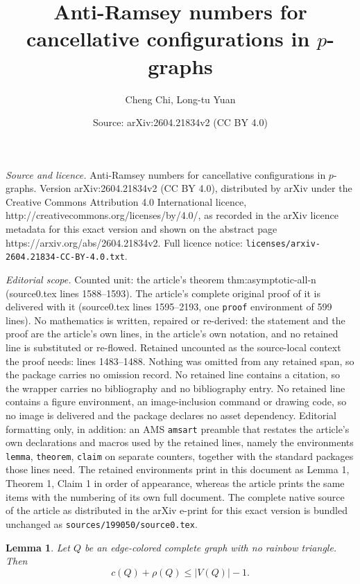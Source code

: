 \documentclass[10pt,a4paper]{amsart}
\title{Anti-Ramsey numbers for cancellative configurations in $p$-graphs}
\author{Cheng Chi, Long-tu Yuan}
\date{Source: arXiv:2604.21834v2 (CC BY 4.0)}
\newtheorem{lemma}{Lemma}
\begin{document}
\maketitle

\noindent\emph{Source and licence.} Anti-Ramsey numbers for cancellative configurations in $p$-graphs. Version arXiv:2604.21834v2 (CC BY 4.0), distributed by arXiv under the Creative Commons Attribution 4.0 International licence, http://creativecommons.org/licenses/by/4.0/, as recorded in the arXiv licence metadata for this exact version and shown on the abstract page https://arxiv.org/abs/2604.21834v2. Full licence notice: \texttt{licenses/arxiv-2604.21834-CC-BY-4.0.txt}.\par\smallskip

\noindent\textit{Editorial scope.} Counted unit: the article's theorem thm:asymptotic-all-n (source0.tex lines 1588--1593). The article's complete original proof of it is delivered with it (source0.tex lines 1595--2193, one \texttt{proof} environment of 599 lines). No mathematics is written, repaired or re-derived: the statement and the proof are the article's own lines, in the article's own notation, and no retained line is substituted or re-flowed.  Retained uncounted as the source-local context the proof needs: lines 1483--1488.  Nothing was omitted from any retained span, so the package carries no omission record.  No retained line contains a citation, so the wrapper carries no bibliography and no bibliography entry.  No retained line contains a figure environment, an image-inclusion command or drawing code, so no image is delivered and the package declares no asset dependency.  Editorial formatting only, in addition: an AMS \texttt{amsart} preamble that restates the article's own declarations and macros used by the retained lines, namely the environments \texttt{lemma}, \texttt{theorem}, \texttt{claim} on separate counters, together with the standard packages those lines need.  The retained environments print in this document as Lemma 1, Theorem 1, Claim 1 in order of appearance, whereas the article prints the same items with the numbering of its own full document.  The complete native source of the article as distributed in the arXiv e-print for this exact version is bundled unchanged as \texttt{sources/199050/source0.tex}.
\begin{lemma}\label{lem:gallai-rho}
    Let $Q$ be an edge-colored complete graph with no rainbow triangle. Then
    \begin{equation}\label{eq:gallai-rho}
        c(Q)+\rho(Q)\le |V(Q)|-1.
    \end{equation}
\end{lemma}
\end{document}
